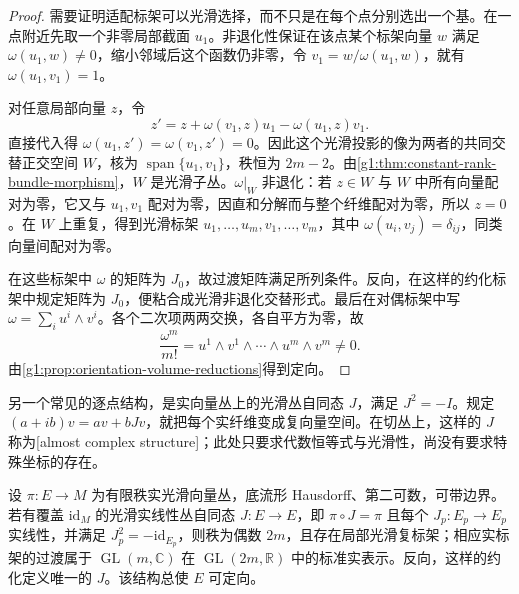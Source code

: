 \begin{proof}
	需要证明适配标架可以光滑选择，而不只是在每个点分别选出一个基。在一点附近先取一个非零局部截面 \(u_1\)。非退化性保证在该点某个标架向量 \(w\) 满足 \(\omega(u_1,w)\neq0\)，缩小邻域后这个函数仍非零，令 \(v_1=w/\omega(u_1,w)\)，就有 \(\omega(u_1,v_1)=1\)。

	对任意局部向量 \(z\)，令
	\[
		z'=z+\omega(v_1,z)u_1-\omega(u_1,z)v_1.
	\]
	直接代入得 \(\omega(u_1,z')=\omega(v_1,z')=0\)。因此这个光滑投影的像为两者的共同交替正交空间 \(W\)，核为 \(\operatorname{span}\{u_1,v_1\}\)，秩恒为 \(2m-2\)。由\cref{g1:thm:constant-rank-bundle-morphism}，\(W\) 是光滑子丛。\(\omega|_W\) 非退化：若 \(z\in W\) 与 \(W\) 中所有向量配对为零，它又与 \(u_1,v_1\) 配对为零，因直和分解而与整个纤维配对为零，所以 \(z=0\)。在 \(W\) 上重复，得到光滑标架 \(u_1,\ldots,u_m,v_1,\ldots,v_m\)，其中 \(\omega(u_i,v_j)=\delta_{ij}\)，同类向量间配对为零。

	在这些标架中 \(\omega\) 的矩阵为 \(J_0\)，故过渡矩阵满足所列条件。反向，在这样的约化标架中规定矩阵为 \(J_0\)，便粘合成光滑非退化交替形式。最后在对偶标架中写 \(\omega=\sum_i u^i\wedge v^i\)。各个二次项两两交换，各自平方为零，故
	\[
		\frac{\omega^m}{m!}=u^1\wedge v^1\wedge\cdots\wedge u^m\wedge v^m\neq0.
	\]
	由\cref{g1:prop:orientation-volume-reductions}得到定向。
\end{proof}

另一个常见的逐点结构，是实向量丛上的光滑丛自同态 \(J\)，满足 \(J^2=-I\)。规定 \((a+ib)v=av+bJv\)，就把每个实纤维变成复向量空间。在切丛上，这样的 \(J\) 称为[almost complex structure]；此处只要求代数恒等式与光滑性，尚没有要求特殊坐标的存在。

\begin{proposition}
	\label{g1:prop:complex-frame-reduction}
	设 \(\pi:E\to M\) 为有限秩实光滑向量丛，底流形 Hausdorff、第二可数，可带边界。若有覆盖 \(\mathrm{id}_M\) 的光滑实线性丛自同态 \(J:E\to E\)，即 \(\pi\circ J=\pi\) 且每个 \(J_p:E_p\to E_p\) 实线性，并满足 \(J_p^2=-\mathrm{id}_{E_p}\)，则秩为偶数 \(2m\)，且存在局部光滑复标架；相应实标架的过渡属于 \(\operatorname{GL}(m,\mathbb C)\) 在 \(\operatorname{GL}(2m,\mathbb R)\) 中的标准实表示。反向，这样的约化定义唯一的 \(J\)。该结构总使 \(E\) 可定向。
\end{proposition}

